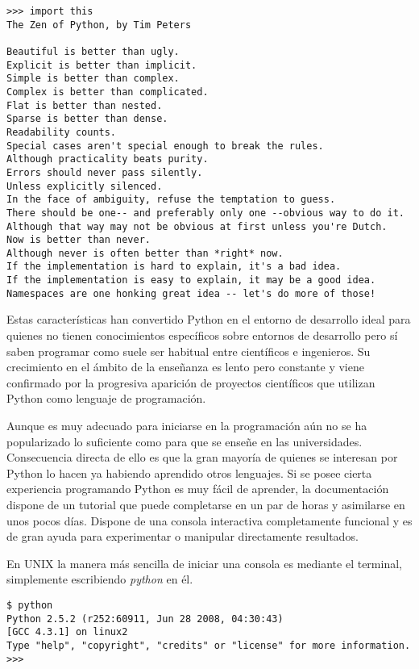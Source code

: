 \documentclass[a4paper,10pt]{article}
\begin{document}
\begin{lstlisting}
>>> import this
The Zen of Python, by Tim Peters

Beautiful is better than ugly.
Explicit is better than implicit.
Simple is better than complex.
Complex is better than complicated.
Flat is better than nested.
Sparse is better than dense.
Readability counts.
Special cases aren't special enough to break the rules.
Although practicality beats purity.
Errors should never pass silently.
Unless explicitly silenced.
In the face of ambiguity, refuse the temptation to guess.
There should be one-- and preferably only one --obvious way to do it.
Although that way may not be obvious at first unless you're Dutch.
Now is better than never.
Although never is often better than *right* now.
If the implementation is hard to explain, it's a bad idea.
If the implementation is easy to explain, it may be a good idea.
Namespaces are one honking great idea -- let's do more of those!
\end{lstlisting}

Estas características han convertido Python en el entorno de
desarrollo ideal para quienes no tienen conocimientos específicos
sobre entornos de desarrollo pero sí saben programar como suele ser
habitual entre científicos e ingenieros. Su crecimiento en el ámbito
de la enseñanza es lento pero constante y viene confirmado por la
progresiva aparición de proyectos científicos que utilizan Python como
lenguaje de programación.

Aunque es muy adecuado para iniciarse en la programación aún no se ha
popularizado lo suficiente como para que se enseñe en las
universidades.  Consecuencia directa de ello es que la gran mayoría de
quienes se interesan por Python lo hacen ya habiendo aprendido otros
lenguajes.  Si se posee cierta experiencia programando Python es muy
fácil de aprender, la documentación dispone de un tutorial que puede
completarse en un par de horas y asimilarse en unos pocos
días. Dispone de una consola interactiva completamente funcional y es
de gran ayuda para experimentar o manipular directamente resultados.

En UNIX la manera más sencilla de iniciar una consola es mediante el
terminal, simplemente escribiendo \emph{python} en él.

\begin{lstlisting}
$ python
Python 2.5.2 (r252:60911, Jun 28 2008, 04:30:43)
[GCC 4.3.1] on linux2
Type "help", "copyright", "credits" or "license" for more information.
>>>                                                                    
\end{lstlisting}
\end{document}
